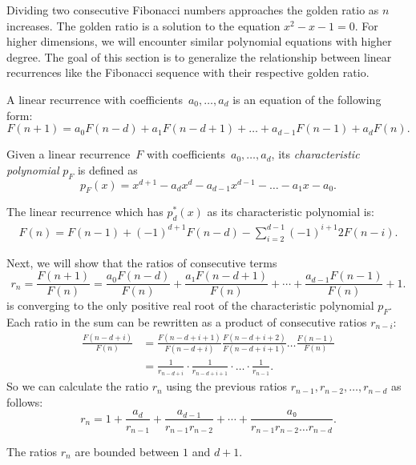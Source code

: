 Dividing two consecutive Fibonacci numbers approaches the golden ratio as $n$ increases.
The golden ratio is a solution to the equation $x^2 - x - 1 = 0$.
For higher dimensions, we will encounter similar polynomial equations with higher degree.
The goal of this section is to generalize the relationship between linear
recurrences like the Fibonacci sequence with their respective golden ratio.

\begin{definition}
  A linear recurrence with coefficients~$a_0, \dots, a_d$ is an equation of the
  following form:
  \[
    F(n + 1) = a_0 F(n - d) + a_1 F(n - d + 1) + \dots + a_{d-1} F(n - 1) + a_d F(n).
  \]
\end{definition}

\begin{definition}
  Given a linear recurrence~$F$ with coefficients~$a_0, \dots, a_d$, its
  \emph{characteristic polynomial} $p_F$ is defined as
  \[
    p_F(x) = x^{d+1} - a_d x^d - a_{d-1} x^{d-1} - \dots - a_1 x - a_0.
  \]
\end{definition}

\begin{example}
  The linear recurrence which has $p_d^*(x)$ as its characteristic polynomial is:
  \begin{align*}
    F(n) = F(n - 1) + (-1)^{d+1} F(n - d) - \sum_{i=2}^{d - 1} (-1)^{i+1} 2 F(n - i).
  \end{align*}
\end{example}

Next, we will show that the ratios of consecutive terms
\[
  r_n = \frac{F(n+1)}{F(n)} = \frac{a_0 F(n - d)}{F(n)} + \frac{a₁ F(n - d + 1)}{F(n)} + ⋯ + \frac{a_{d-1} F(n-1)}{F(n)} + 1.
\]
is converging to the only positive real root of the characteristic polynomial $p_F$.
Each ratio in the sum can be rewritten as a product of consecutive ratios $r_{n-i}$:
\begin{align*}
  \frac{F(n - d + i)}{F(n)}
  & = \frac{F(n - d + i + 1)}{F(n - d + i)} \frac{F(n - d + i + 2)}{F(n - d + i + 1)} \dots \frac{F(n-1)}{F(n)} \\
  & = \frac{1}{r_{n - d + i}} · \frac{1}{r_{n - d + i + 1}} · \dots · \frac{1}{r_{n-1}}.
\end{align*}
So we can calculate the ratio $r_n$ using the previous ratios $r_{n-1}, r_{n-2}, …, r_{n-d}$ as follows:
\[
  r_n = 1 + \frac{a_d}{r_{n-1}} + \frac{a_{d-1}}{r_{n-1} r_{n-2}} + ⋯ + \frac{a₀}{r_{n-1} r_{n-2} \dots r_{n-d}}.
\]


\begin{lemma}
  The ratios $r_n$ are bounded between $1$ and $d+1$.
\end{lemma}

